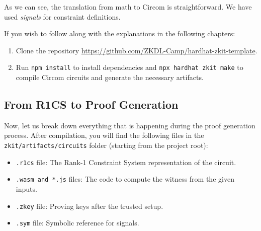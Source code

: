 \documentclass[../../book.tex]{subfiles}
\begin{document}

As we can see, the translation from math to Circom is straightforward.
We have used \textit{signals} for constraint definitions.

\begin{remark}
    If you wish to follow along with the explanations in the following chapters:
    \begin{enumerate}
        \item Clone the repository \url{https://github.com/ZKDL-Camp/hardhat-zkit-template}.
        \item Run \texttt{npm install} to install dependencies and \texttt{npx hardhat zkit make}
        to compile Circom circuits and generate the necessary artifacts.
    \end{enumerate}
\end{remark}

\subsection{From R1CS to Proof Generation}

Now, let us break down everything that is happening during the proof
generation process. After compilation, you will find the following files in
the \\
\texttt{zkit/artifacts/circuits} folder (starting from the project root):
\begin{itemize}
    \item \texttt{.r1cs} file: The Rank-1 Constraint System representation of the circuit.
    \item \texttt{.wasm and *.js} files: The code to compute the witness from the given inputs.
    \item \texttt{.zkey} file: Proving keys after the trusted setup.
    \item \texttt{.sym} file: Symbolic reference for signals.
\end{itemize}
\end{document}
